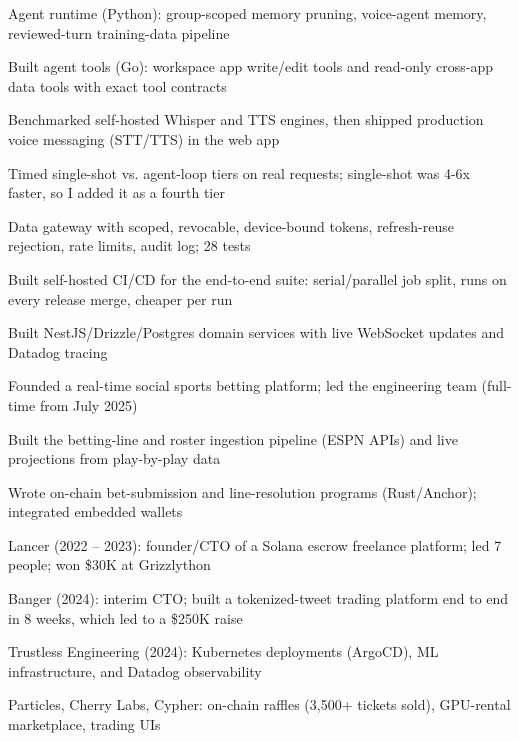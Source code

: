 \documentclass[print]{jack-resume}
\begin{document}
\begin{tightemize}
    \item Agent runtime (Python): group-scoped memory pruning, voice-agent memory, reviewed-turn training-data pipeline
    \item Built agent tools (Go): workspace app write/edit tools and read-only cross-app data tools with exact tool contracts
    \item Benchmarked self-hosted Whisper and TTS engines, then shipped production voice messaging (STT/TTS) in the web app
    \item Timed single-shot vs. agent-loop tiers on real requests; single-shot was 4-6x faster, so I added it as a fourth tier
    \item Data gateway with scoped, revocable, device-bound tokens, refresh-reuse rejection, rate limits, audit log; 28 tests
    \item Built self-hosted CI/CD for the end-to-end suite: serial/parallel job split, runs on every release merge, cheaper per run
\end{tightemize}
\sectionsep

\begin{tightemize}
    \item Built NestJS/Drizzle/Postgres domain services with live WebSocket updates and Datadog tracing
    \item Founded a real-time social sports betting platform; led the engineering team (full-time from July 2025)
    \item Built the betting-line and roster ingestion pipeline (ESPN APIs) and live projections from play-by-play data
    \item Wrote on-chain bet-submission and line-resolution programs (Rust/Anchor); integrated embedded wallets
\end{tightemize}
\sectionsep

\begin{tightemize}
    \item Lancer (2022 – 2023): founder/CTO of a Solana escrow freelance platform; led 7 people; won \$30K at Grizzlython
    \item Banger (2024): interim CTO; built a tokenized-tweet trading platform end to end in 8 weeks, which led to a \$250K raise
    \item Trustless Engineering (2024): Kubernetes deployments (ArgoCD), ML infrastructure, and Datadog observability
    \item Particles, Cherry Labs, Cypher: on-chain raffles (3,500+ tickets sold), GPU-rental marketplace, trading UIs
\end{tightemize}
\sectionsep
\end{document}
